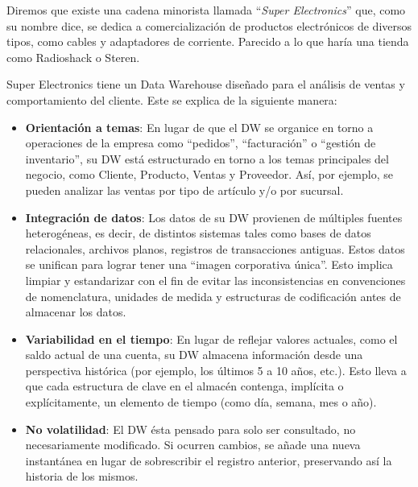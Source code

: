 Diremos que existe una cadena minorista llamada ``\textit{Super Electronics}'' que, como su nombre dice, se dedica a comercialización de productos electrónicos de diversos tipos, como cables y adaptadores de corriente. Parecido a lo que haría una tienda como Radioshack o Steren.

Super Electronics tiene un Data Warehouse diseñado para el análisis de ventas y comportamiento del cliente. Este se explica de la siguiente manera:

\begin{itemize}

    \item \textbf{Orientación a temas}: En lugar de que el DW se organice en torno a operaciones de la empresa como ``pedidos'', ``facturación'' o ``gestión de inventario'', su DW está estructurado en torno a los temas principales del negocio, como Cliente, Producto, Ventas y Proveedor. Así, por ejemplo, se pueden analizar las ventas por tipo de artículo y/o por sucursal.

    \item \textbf{Integración de datos}: Los datos de su DW provienen de múltiples fuentes heterogéneas, es decir, de distintos sistemas tales como bases de datos relacionales, archivos planos, registros de transacciones antiguas. Estos datos se unifican para lograr tener una ``imagen corporativa única''. Esto implica limpiar y estandarizar con el fin de evitar las inconsistencias en convenciones de nomenclatura, unidades de medida y estructuras de codificación antes de almacenar los datos.

    \item \textbf{Variabilidad en el tiempo}: En lugar de reflejar valores actuales, como el saldo actual de una cuenta, su DW almacena información desde una perspectiva histórica (por ejemplo, los últimos 5 a 10 años, etc.). Esto lleva a que cada estructura de clave en el almacén contenga, implícita o explícitamente, un elemento de tiempo (como día, semana, mes o año).

    \item \textbf{No volatilidad}: El DW ésta pensado para solo ser consultado, no necesariamente modificado. Si ocurren cambios, se añade una nueva instantánea en lugar de sobrescribir el registro anterior, preservando así la historia de los mismos.

\end{itemize}
